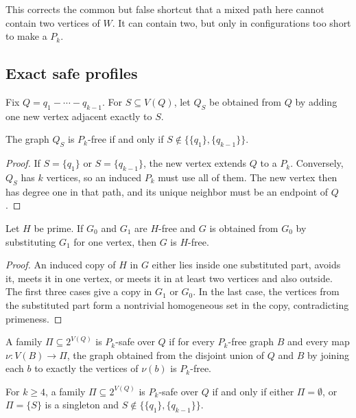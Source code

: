 This corrects the common but false shortcut that a mixed path here cannot contain two vertices of $W$. It can contain two, but only in configurations too short to make a $P_k$.

\subsection{Exact safe profiles}

Fix $Q=q_1-\cdots-q_{k-1}$. For $S\subseteq V(Q)$, let $Q_S$ be obtained from $Q$ by adding one new vertex adjacent exactly to $S$.

\begin{lemma}\label{lem:one-vertex-extension}
The graph $Q_S$ is $P_k$-free if and only if $S\notin\{\{q_1\},\{q_{k-1}\}\}$.
\end{lemma}

\begin{proof}
If $S=\{q_1\}$ or $S=\{q_{k-1}\}$, the new vertex extends $Q$ to a $P_k$. Conversely, $Q_S$ has $k$ vertices, so an induced $P_k$ must use all of them. The new vertex then has degree one in that path, and its unique neighbor must be an endpoint of $Q$.
\end{proof}

\begin{lemma}\label{lem:substitution}
Let $H$ be prime. If $G_0$ and $G_1$ are $H$-free and $G$ is obtained from $G_0$ by substituting $G_1$ for one vertex, then $G$ is $H$-free.
\end{lemma}

\begin{proof}
An induced copy of $H$ in $G$ either lies inside one substituted part, avoids it, meets it in one vertex, or meets it in at least two vertices and also outside. The first three cases give a copy in $G_1$ or $G_0$. In the last case, the vertices from the substituted part form a nontrivial homogeneous set in the copy, contradicting primeness.
\end{proof}

\begin{definition}
A family $\Pi\subseteq 2^{V(Q)}$ is $P_k$-safe over $Q$ if for every $P_k$-free graph $B$ and every map $\nu:V(B)\to\Pi$, the graph obtained from the disjoint union of $Q$ and $B$ by joining each $b$ to exactly the vertices of $\nu(b)$ is $P_k$-free.
\end{definition}

\begin{theorem}\label{thm:safe-profiles}
For $k\ge 4$, a family $\Pi\subseteq 2^{V(Q)}$ is $P_k$-safe over $Q$ if and only if either $\Pi=\emptyset$, or $\Pi=\{S\}$ is a singleton and $S\notin\{\{q_1\},\{q_{k-1}\}\}$.
\end{theorem}

